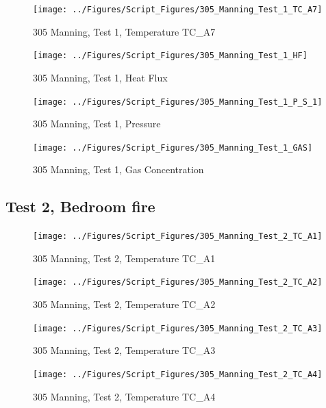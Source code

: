 \documentclass[12pt,oneside]{book}
\begin{document}
\begin{figure}[!ht]
\texttt{[image: ../Figures/Script\_Figures/305\_Manning\_Test\_1\_TC\_A7]}
\caption{305 Manning, Test 1, Temperature TC\_A7}
\label{fig:305_Manning_Test_1_TC_A7}
\end{figure}

\begin{figure}[!ht]
\texttt{[image: ../Figures/Script\_Figures/305\_Manning\_Test\_1\_HF]}
\caption{305 Manning, Test 1, Heat Flux}
\label{fig:305_Manning_Test_1_HF}
\end{figure}

\begin{figure}[!ht]
\texttt{[image: ../Figures/Script\_Figures/305\_Manning\_Test\_1\_P\_S\_1]}
\caption{305 Manning, Test 1, Pressure}
\label{fig:305_Manning_Test_1_P_S_1}
\end{figure}

\begin{figure}[!ht]
\texttt{[image: ../Figures/Script\_Figures/305\_Manning\_Test\_1\_GAS]}
\caption{305 Manning, Test 1, Gas Concentration}
\label{fig:305_Manning_Test_1_GAS}
\end{figure}


\clearpage


\subsection{Test 2, Bedroom fire}

\begin{figure}[!ht]
\texttt{[image: ../Figures/Script\_Figures/305\_Manning\_Test\_2\_TC\_A1]}
\caption{305 Manning, Test 2, Temperature TC\_A1}
\label{fig:305_Manning_Test_2_TC_A1}
\end{figure}

\begin{figure}[!ht]
\texttt{[image: ../Figures/Script\_Figures/305\_Manning\_Test\_2\_TC\_A2]}
\caption{305 Manning, Test 2, Temperature TC\_A2}
\label{fig:305_Manning_Test_2_TC_A2}
\end{figure}

\begin{figure}[!ht]
\texttt{[image: ../Figures/Script\_Figures/305\_Manning\_Test\_2\_TC\_A3]}
\caption{305 Manning, Test 2, Temperature TC\_A3}
\label{fig:305_Manning_Test_2_TC_A3}
\end{figure}

\begin{figure}[!ht]
\texttt{[image: ../Figures/Script\_Figures/305\_Manning\_Test\_2\_TC\_A4]}
\caption{305 Manning, Test 2, Temperature TC\_A4}
\label{fig:305_Manning_Test_2_TC_A4}
\end{figure}
\end{document}
